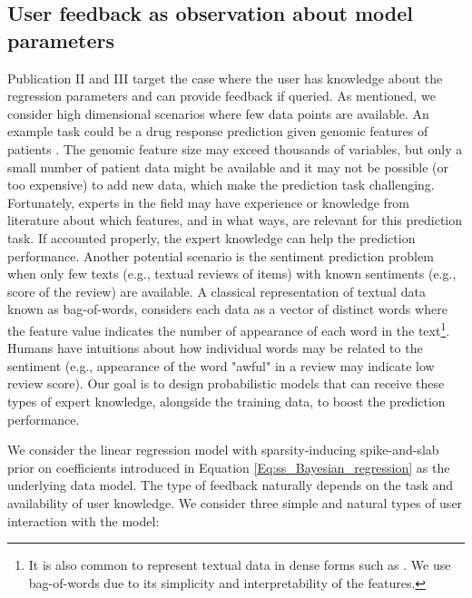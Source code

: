 \documentclass[dissertation,math,vertlayout,pdfa,colorlinks]{aaltoseries}
\begin{document}
\subsection{User feedback as observation about model parameters}\label{KE_models}

Publication II and III target the case where the user has knowledge about the regression parameters and can provide feedback if queried. As mentioned, we consider high dimensional scenarios where few data points are available. An example task could be a drug response prediction given genomic features of patients \cite{drug_response_prediction}. The genomic feature size may exceed thousands of variables, but only a small number of patient data might be available and it may not be possible (or too expensive) to add new data, which make the prediction task challenging. Fortunately, experts in the field may have experience or knowledge from literature about which features, and in what ways, are relevant for this prediction task. If accounted properly, the expert knowledge can help the prediction performance. Another potential scenario is the sentiment prediction problem \cite{liu2015sentiment} when only few texts (e.g., textual reviews of items) with known sentiments (e.g., score of the review) are available. A classical representation of textual data known as bag-of-words, considers each data as a vector of distinct words where the feature value indicates the number of appearance of each word in the text\footnote{It is also common to represent textual data in dense forms such as \cite{dai2015semi}. We use bag-of-words due to its simplicity and interpretability of the features.}. Humans have intuitions about how individual words may be related to the sentiment (e.g., appearance of the word "awful" in a review may indicate low review score). Our goal is to design probabilistic models that can receive these types of expert knowledge, alongside the training data, to boost the prediction performance.  

We consider the linear regression model with sparsity-inducing spike-and-slab prior on coefficients introduced in Equation \ref{Eq:ss_Bayesian_regression} as the underlying data model. The type of feedback naturally depends on the task and availability of user knowledge.  We consider three simple and natural types of user interaction with the model: 
\end{document}
